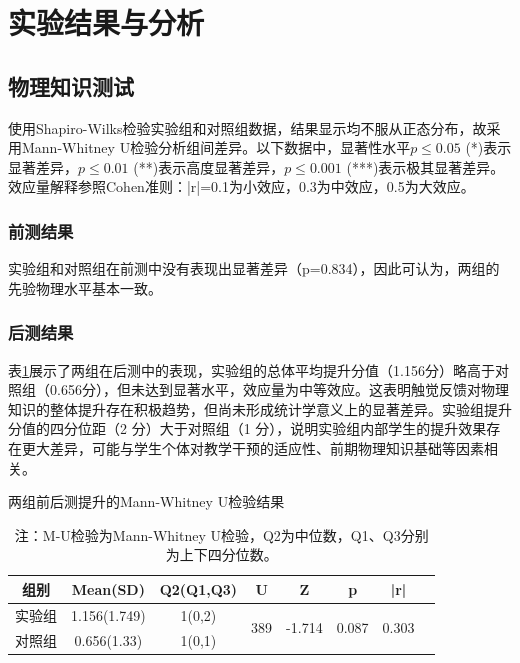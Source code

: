 \documentclass[runningheads]{llncs}
\begin{document}
\section{实验结果与分析}
\subsection{物理知识测试}
使用Shapiro-Wilks检验实验组和对照组数据，结果显示均不服从正态分布，故采用Mann-Whitney U检验分析组间差异。以下数据中，显著性水平$p \le 0.05$ (*)表示显著差异，$p \le 0.01$ (**)表示高度显著差异，$p \le 0.001$ (***)表示极其显著差异。效应量解释参照Cohen准则：|r|=0.1为小效应，0.3为中效应，0.5为大效应。

\subsubsection{前测结果}
实验组和对照组在前测中没有表现出显著差异（p=0.834），因此可认为，两组的先验物理水平基本一致。

\subsubsection{后测结果}
表\ref{tab:learning-effect}展示了两组在后测中的表现，实验组的总体平均提升分值（1.156分）略高于对照组（0.656分），但未达到显著水平，效应量为中等效应。这表明触觉反馈对物理知识的整体提升存在积极趋势，但尚未形成统计学意义上的显著差异。实验组提升分值的四分位距（2 分）大于对照组（1 分），说明实验组内部学生的提升效果存在更大差异，可能与学生个体对教学干预的适应性、前期物理知识基础等因素相关。

\begin{table}[t]
\centering
\setlength{\tabcolsep}{10pt} %
\caption{两组前后测提升的Mann-Whitney U检验结果}
\label{tab:learning-effect}
\begin{tabularx}{\textwidth}{cccccccc}
\toprule
\textbf{组别} & \textbf{Mean(SD)} & \textbf{Q2(Q1,Q3)} & \textbf{U} & \textbf{Z} & \textbf{p} & \textbf{|r|} \\
\midrule

实验组 & 1.156(1.749) & 1(0,2) & \multirow{2}{*}{389} & \multirow{2}{*}{-1.714} & \multirow{2}{*}{0.087} & \multirow{2}{*}{0.303} \\
对照组 & 0.656(1.33) & 1(0,1) \\
\bottomrule
\end{tabularx}
\caption*{注：M-U检验为Mann-Whitney U检验，Q2为中位数，Q1、Q3分别为上下四分位数。}
\end{table}
\end{document}
